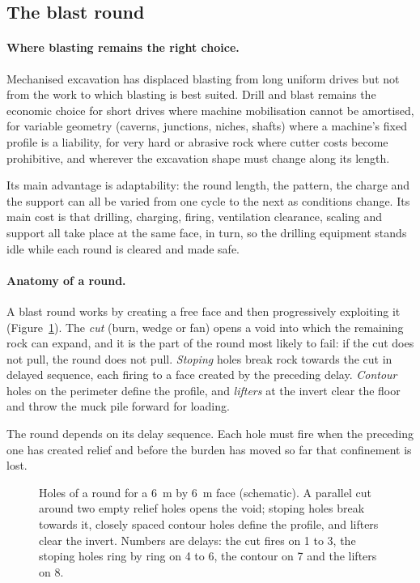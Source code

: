 \subsection{The blast round}
\label{sec:blast-round}

\paragraph{Where blasting remains the right choice.}
Mechanised excavation has displaced blasting from long uniform drives but not
from the work to which blasting is best suited. Drill and blast remains
the economic choice for short drives where machine mobilisation cannot be
amortised, for variable geometry (caverns, junctions, niches, shafts)
where a machine's fixed profile is a liability, for very hard or abrasive rock
where cutter costs become prohibitive, and wherever the excavation shape must
change along its length.

Its main advantage is adaptability: the round length, the pattern, the
charge and the support can all be varied from one cycle to the next as
conditions change. Its main cost is that drilling, charging, firing,
ventilation clearance, scaling and support all take place at the same face,
in turn, so the drilling equipment stands idle while each round is cleared
and made safe.

\paragraph{Anatomy of a round.}
A blast round works by creating a free face and then progressively exploiting
it (Figure~\ref{fig:blast-round}). The \emph{cut} (burn, wedge or fan) opens a void into which the
remaining rock can expand, and it is the part of the round most likely to
fail: if the cut does not pull, the round does not pull. \emph{Stoping} holes
break rock towards the cut in delayed sequence, each firing to a face created
by the preceding delay. \emph{Contour} holes on the perimeter define the
profile, and \emph{lifters} at the invert clear the floor and throw the muck
pile forward for loading.

The round depends on its delay sequence. Each hole must fire when the
preceding one has created relief and before the burden has moved so far that
confinement is lost.

\begin{figure}[htbp]
\centering
{}
\caption{Holes of a round for a 6~m by 6~m face (schematic). A parallel cut around two empty relief holes opens the void; stoping holes break towards it, closely spaced contour holes define the profile, and lifters clear the invert. Numbers are delays: the cut fires on 1 to 3, the stoping holes ring by ring on 4 to 6, the contour on 7 and the lifters on 8.}
\label{fig:blast-round}
\end{figure}

